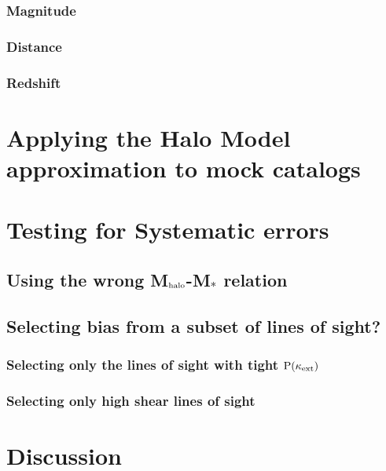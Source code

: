 \documentclass[useAMS,usenatbib]{mn2e}
\begin{document}
\subsubsection{Magnitude}
\subsubsection{Distance}
\subsubsection{Redshift}



\section{Applying the Halo Model approximation to mock catalogs}
\label{sec:obsMstar+z}


\section{Testing for Systematic errors}
\subsection{Using the wrong M$_{\rm halo}$-M$_{*}$ relation}
\subsection{Selecting bias from a subset of lines of sight?}
\subsubsection{Selecting only the lines of sight with tight ${\rm P}(\kappa_{\rm ext})$}
\subsubsection{Selecting only high shear lines of sight}


\section{Discussion}
\label{sec:discuss}
\end{document}
